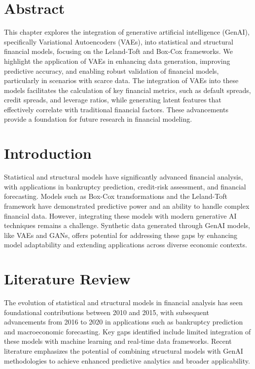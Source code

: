 \documentclass[a4paper,headinclude=on,footinclude=on,12pt,oneside]{scrbook}
\begin{document}
\section*{Abstract}
This chapter explores the integration of generative artificial intelligence (GenAI), specifically Variational Autoencoders (VAEs), into statistical and structural financial models, focusing on the Leland-Toft and Box-Cox frameworks. We highlight the application of VAEs in enhancing data generation, improving predictive accuracy, and enabling robust validation of financial models, particularly in scenarios with scarce data. The integration of VAEs into these models facilitates the calculation of key financial metrics, such as default spreads, credit spreads, and leverage ratios, while generating latent features that effectively correlate with traditional financial factors. These advancements provide a foundation for future research in financial modeling.

\section{Introduction}
Statistical and structural models have significantly advanced financial analysis, with applications in bankruptcy prediction, credit-risk assessment, and financial forecasting. Models such as Box-Cox transformations and the Leland-Toft framework have demonstrated predictive power and an ability to handle complex financial data. However, integrating these models with modern generative AI techniques remains a challenge. Synthetic data generated through GenAI models, like VAEs and GANs, offers potential for addressing these gaps by enhancing model adaptability and extending applications across diverse economic contexts.

\section{Literature Review}
The evolution of statistical and structural models in financial analysis has seen foundational contributions between 2010 and 2015, with subsequent advancements from 2016 to 2020 in applications such as bankruptcy prediction and macroeconomic forecasting. Key gaps identified include limited integration of these models with machine learning and real-time data frameworks. Recent literature emphasizes the potential of combining structural models with GenAI methodologies to achieve enhanced predictive analytics and broader applicability.
\end{document}
